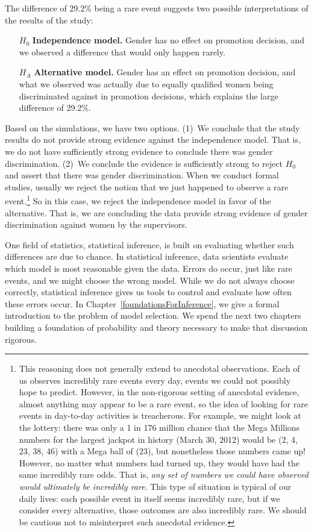 The difference of 29.2\% being a rare event suggests two possible interpretations of the results of the study:
\begin{itemize}
\setlength{\itemsep}{0mm}
\item[$H_0$] \textbf{Independence model.} Gender has no effect on promotion decision, and we observed a difference that would only happen rarely.
\item[$H_A$] \textbf{Alternative model.} Gender has an effect on promotion decision, and what we observed was actually due to equally qualified women being discriminated against in promotion decisions, which explains the large difference of 29.2\%.
\end{itemize}
Based on the simulations, we have two options. (1)~We conclude that the study results do not provide strong evidence against the independence model. That is, we do not have sufficiently strong evidence to conclude there was gender discrimination. (2)~We conclude the evidence is sufficiently strong to reject $H_0$ and assert that there was gender discrimination. When we conduct formal studies, usually we reject the notion that we just happened to observe a rare event.\footnote{This reasoning does not generally extend to anecdotal observations. Each of us observes incredibly rare events every day, events we could not possibly hope to predict. However, in the non-rigorous setting of anecdotal evidence, almost anything may appear to be a rare event, so the idea of looking for rare events in day-to-day activities is treacherous. For example, we might look at the lottery: there was only a 1 in 176 million chance that the Mega Millions numbers for the largest jackpot in history (March 30, 2012) would be (2, 4, 23, 38, 46) with a Mega ball of (23), but nonetheless those numbers came up! However, no matter what numbers had turned up, they would have had the same incredibly rare odds. That is, \emph{any set of numbers we could have observed would ultimately be incredibly rare}. This type of situation is typical of our daily lives: each possible event in itself seems incredibly rare, but if we consider every alternative, those outcomes are also incredibly rare. We should be cautious not to misinterpret such anecdotal evidence.} So in this case, we reject the independence model in favor of the alternative. That is, we are concluding the data provide strong evidence of gender discrimination against women by the supervisors.


One field of statistics, statistical inference, is built on evaluating whether such differences are due to chance. In statistical inference, data scientists evaluate which model is most reasonable given the data. Errors do occur, just like rare events, and we might choose the wrong model. While we do not always choose correctly, statistical inference gives us tools to control and evaluate how often these errors occur. In Chapter~\ref{foundationsForInference}, we give a formal introduction to the problem of model selection. We spend the next two chapters building a foundation of probability and theory necessary to make that discussion rigorous.

